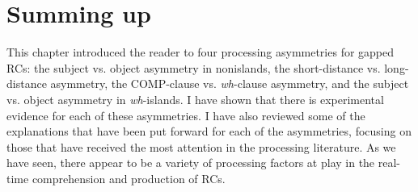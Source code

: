 
\section{Summing up}\label{gap-conclusion}

This chapter introduced the reader to four processing asymmetries for gapped RCs: the subject vs. object asymmetry in nonislands, the short-distance vs. long-distance asymmetry, the COMP-clause vs. \textit{wh}-clause asymmetry, and the subject vs. object asymmetry in \textit{wh}-islands. I have shown that there is experimental evidence for each of these asymmetries. I have also reviewed some of the explanations that have been put forward for each of the asymmetries, focusing on those that have received the most attention in the processing literature. As we have seen, there appear to be a variety of processing factors at play in the real-time comprehension and production of RCs.